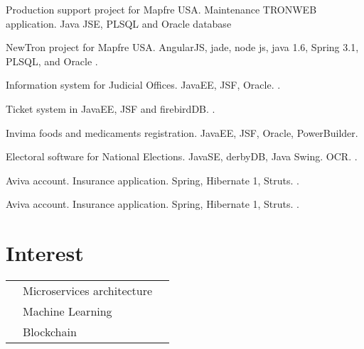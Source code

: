 \documentclass[]{deedy-resume-openfont}
\begin{document}
\begin{minipage}[t]{0.66\textwidth}
\begin{tightemize}
\item Production support project for Mapfre USA. Maintenance TRONWEB application. Java JSE, PLSQL and Oracle database
\item NewTron project for Mapfre USA. AngularJS, jade, node js, java 1.6, Spring 3.1, PLSQL, and Oracle
.\end{tightemize}
\sectionsep

\begin{tightemize}
\item Information system for Judicial Offices. JavaEE, JSF, Oracle.   
.\end{tightemize}
\sectionsep

\begin{tightemize}
\item Ticket system  in JavaEE, JSF and firebirdDB.  
.\end{tightemize}
\sectionsep

\begin{tightemize}
\item Invima foods and medicaments registration. JavaEE, JSF, Oracle, PowerBuilder. 
\item Electoral software for National Elections. JavaSE, derbyDB, Java Swing. OCR. 
.\end{tightemize}
\sectionsep

\begin{tightemize}
\item Aviva account. Insurance application. Spring, Hibernate 1, Struts. 
.\end{tightemize}
\sectionsep

\begin{tightemize}
\item Aviva account. Insurance application. Spring, Hibernate 1, Struts. 
.\end{tightemize}
\sectionsep


\section{Interest} 
\begin{tabular}{rll}
& Microservices architecture\\
& Machine Learning \\
& Blockchain \\
\end{tabular}
\sectionsep

\end{minipage} 
\end{document}
